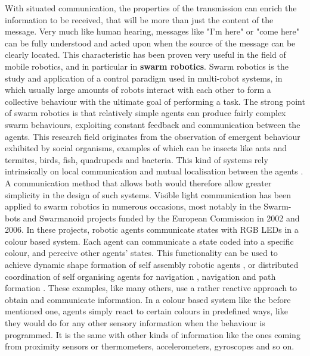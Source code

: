 With situated communication, the properties of the transmission can enrich the information to be received, that will be more than just the content of the message.
Very much like human hearing, messages like "I'm here" or "come here" can be fully understood and acted upon when the source of the message can be clearly located.
\newline
This characteristic has been proven very useful in the field of mobile robotics, and in particular in \textbf{swarm robotics}.
Swarm robotics is the study and application of a control paradigm used in multi-robot systems, in which usually large amounts of robots interact with each other to form a collective behaviour with the ultimate goal of performing a task.
The strong point of swarm robotics is that relatively simple agents can produce fairly complex swarm behaviours, exploiting constant feedback and communication between the agents.
This research field originates from the observation of emergent behaviour exhibited by social organisms, examples of which can be insects like ants and termites, birds, fish, quadrupeds and bacteria.
This kind of systems rely intrinsically on local communication and mutual localisation between the agents 
\cite{architecturesswarm}.
A communication method that allows both would therefore allow greater simplicity in the design of such systems.
\newline
Visible light communication has been applied to swarm robotics in numerous occasions, most notably in the Swarm-bots and Swarmanoid projects funded by the European Commission in 2002 and 2006.
In these projects, robotic agents communicate states with RGB LEDs in a colour based system.
Each agent can communicate a state coded into a specific colour, and perceive other agents' states.
This functionality can be used to achieve dynamic shape formation of self assembly robotic agents  \cite{assemblysbots}, or distributed coordination of self organising agents for navigation \cite{distrcoord} \cite{holeavoidance}, navigation and path formation \cite{pathformation}.
\newline
These examples, like many others, use a rather reactive approach to obtain and communicate information.
In a colour based system like the before mentioned one, agents simply react to certain colours in predefined ways, like they would do for any other sensory information when the behaviour is programmed.
It is the same with other kinds of information like the ones coming from proximity sensors or thermometers, accelerometers, gyroscopes and so on.
